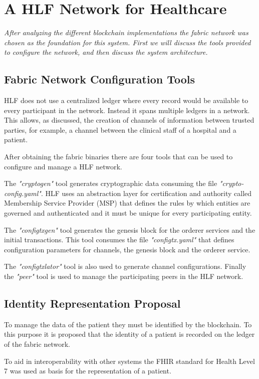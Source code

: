 \documentclass[notitlepage]{llncs}
\begin{document}

\section{A HLF Network for Healthcare} \label{HLFHealthcare}
\textit{After analyzing the different blockchain implementations the fabric network was chosen as the foundation for this system. First we will discuss the tools provided to configure the network, and then discuss the system architecture.}

\subsection{Fabric Network Configuration Tools}

HLF does not use a centralized ledger where every record would be available to every participant in the network. Instead it spans multiple ledgers in a network. This allows, as discussed, the creation of channels of information between trusted parties, for example, a channel between the clinical staff of a hospital and a patient.
\par
After obtaining the fabric binaries there are four tools that can be used to configure and manage a HLF network.
\par
The \textit{"cryptogen"} tool generates cryptographic data consuming the file \textit{"crypto-config.yaml"}. HLF uses an abstraction layer for certification and authority called Membership Service Provider (MSP) that defines the rules by which entities are governed and authenticated and it must be unique for every participating entity.
\par
The \textit{"configtxgen"} tool generates the genesis block for the orderer services and the initial transactions. This tool consumes the file \textit{"configtx.yaml"} that defines configuration parameters for channels, the genesis block and the orderer service.
\par
The \textit{"configtxlator"} tool is also used to generate channel configurations. Finally the \textit{"peer"} tool is used to manage the participating peers in the HLF network.

\subsection{Identity Representation Proposal}

To manage the data of the patient they must be identified by the blockchain. To this purpose it is proposed that the identity of a patient is recorded on the ledger of the fabric network.
\par
To aid in interoperability with other systems the FHIR standard for Health Level 7 was used as basis for the representation of a patient.
\end{document}
